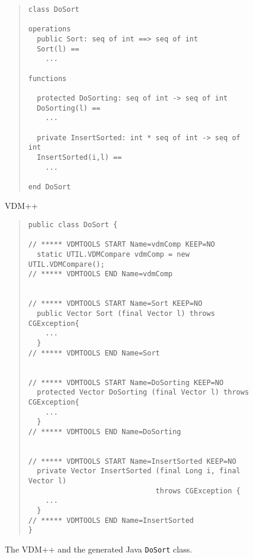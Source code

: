\documentclass[\pformat,11pt]{article}
\begin{document}
\begin{figure}
\begin{center}
\begin{quote}
\begin{small}
\begin{verbatim}  
class DoSort

operations
  public Sort: seq of int ==> seq of int
  Sort(l) ==
    ...

functions

  protected DoSorting: seq of int -> seq of int
  DoSorting(l) ==
    ...

  private InsertSorted: int * seq of int -> seq of int
  InsertSorted(i,l) ==
    ...

end DoSort
\end{verbatim}
\end{small}
\end{quote}
VDM++ 
\begin{quote}
\begin{small}
\begin{verbatim}  
public class DoSort {

// ***** VDMTOOLS START Name=vdmComp KEEP=NO
  static UTIL.VDMCompare vdmComp = new UTIL.VDMCompare();
// ***** VDMTOOLS END Name=vdmComp


// ***** VDMTOOLS START Name=Sort KEEP=NO
  public Vector Sort (final Vector l) throws CGException{
    ...
  }
// ***** VDMTOOLS END Name=Sort


// ***** VDMTOOLS START Name=DoSorting KEEP=NO
  protected Vector DoSorting (final Vector l) throws CGException{    
    ...
  }
// ***** VDMTOOLS END Name=DoSorting


// ***** VDMTOOLS START Name=InsertSorted KEEP=NO
  private Vector InsertSorted (final Long i, final Vector l) 
                              throws CGException {    
    ...
  }
// ***** VDMTOOLS END Name=InsertSorted
}
\end{verbatim}
\end{small}
\end{quote}
\caption{The VDM++ and the generated Java {\tt DoSort} class.\label{fig:vdmjava}}
\end{center}
\end{figure}
\end{document}
